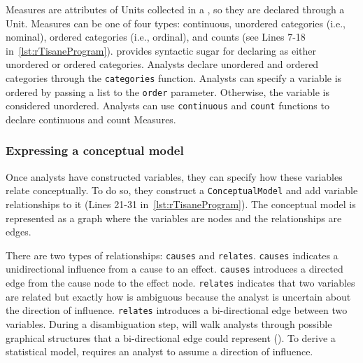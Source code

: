 Measures are attributes of Units collected in a \dataSet, so they are declared
through a Unit. Measures can be one of four
types: continuous, unordered categories (i.e., nominal), ordered categories
(i.e., ordinal), and counts (see Lines 7-18 in~\autoref{lst:rTisaneProgram}). \rTisane provides syntactic sugar for declaring
\Conditions as either unordered or ordered categories. Analysts declare
unordered and ordered categories through the \texttt{categories} function.
Analysts can specify a variable is ordered by passing a list to the
\texttt{order} parameter. Otherwise, the variable is considered unordered.
Analysts can use \texttt{continuous} and \texttt{count} functions to declare
continuous and count Measures. 


\begin{comment}
Units
syntactic sugar: `Participant'

Measures
syntactic sugar: `condition'
\end{comment}


\def\causes{\texttt{causes}\xspace}
\def\relates{\texttt{relates}\xspace}
\def\when{\texttt{when}\xspace}
\def\then{\texttt{then}\xspace}
\def\assume{\texttt{assume}\xspace}
\def\hypothesize{\texttt{hypothesize}\xspace}

\subsubsection{Expressing a conceptual model}
Once analysts have constructed variables, they can specify how these variables
relate conceptually. To do so, they construct a \texttt{ConceptualModel} and add
variable relationships to it (Lines 21-31 in~\autoref{lst:rTisaneProgram}). The conceptual model %
is represented as a graph where the variables are nodes and the relationships
are edges. 

There are two types of relationships: \causes and \relates. \causes indicates a
unidirectional influence from a cause to an effect. \causes
introduces a directed edge from the cause node to the effect node. \relates
indicates that two variables are related but exactly how is ambiguous because
the analyst is uncertain about the direction of influence. \relates introduces a
bi-directional edge  between two variables. During a disambiguation step,
\rTisane will walk analysts through possible graphical structures that a
bi-directional edge could represent (\considerPossibilities). To derive a
statistical model, \rTisane requires an analyst to assume a direction of
influence.


